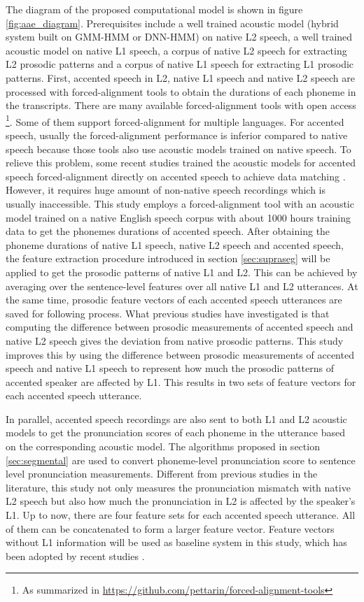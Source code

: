 The diagram of the proposed computational model is shown in figure \ref{fig:aae_diagram}. Prerequisites include a well trained acoustic model (hybrid system built on GMM-HMM or DNN-HMM) on native L2 speech, a well trained acoustic model on native L1 speech, a corpus of native L2 speech for extracting L2 prosodic patterns and a corpus of native L1 speech for extracting L1 prosodic patterns. First, accented speech in L2, native L1 speech and native L2 speech are processed with forced-alignment tools to obtain the durations of each phoneme in the transcripts. There are many available forced-alignment tools with open access \footnote{As summarized in \url{https://github.com/pettarin/forced-alignment-tools}}. Some of them support forced-alignment for multiple languages. For accented speech, usually the forced-alignment performance is inferior compared to native speech because those tools also use acoustic models trained on native speech. To relieve this problem, some recent studies trained the acoustic models for accented speech forced-alignment directly on accented speech to achieve data matching \citep{tao2016exploring, qian2017bidirectional}. However, it requires huge amount of non-native speech recordings which is usually inaccessible. This study employs a forced-alignment tool with an acoustic model trained on a native English speech corpus with about 1000 hours training data to get the phonemes durations of accented speech. After obtaining the phoneme durations of native L1 speech, native L2 speech and accented speech, the feature extraction procedure introduced in section \ref{sec:supraseg} will be applied to get the prosodic patterns of native L1 and L2. This can be achieved by averaging over the sentence-level features over all native L1 and L2 utterances. At the same time, prosodic feature vectors of each accented speech utterances are saved for following process. What previous studies have investigated is that computing the difference between prosodic measurements of accented speech and native L2 speech gives the deviation from native prosodic patterns. This study improves this by using the difference between prosodic measurements of accented speech and native L1 speech to represent how much the prosodic patterns of accented speaker are affected by L1. This results in two sets of feature vectors for each accented speech utterance.

In parallel, accented speech recordings are also sent to both L1 and L2 acoustic models to get the pronunciation scores of each phoneme in the utterance based on the corresponding acoustic model. The algorithms proposed in section \ref{sec:segmental} are used to convert phoneme-level pronunciation score to sentence level pronunciation measurements. Different from previous studies in the literature, this study not only measures the pronunciation mismatch with native L2 speech but also how much the pronunciation in L2 is affected by the speaker's L1. Up to now, there are four feature sets for each accented speech utterance. All of them can be concatenated to form a larger feature vector. Feature vectors without L1 information will be used as baseline system in this study, which has been adopted by recent studies \citep{black2015automated, tao2016exploring, qian2017bidirectional}.

